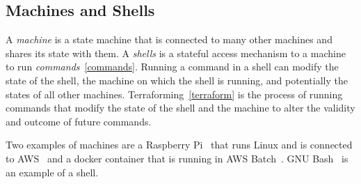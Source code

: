 \subsection{Machines and Shells}
\label{machine}

A \emph{machine} is a state machine that is connected to many other machines and shares its state with them. A \emph{shells} is a stateful access mechanism to a machine to run \emph{commands}~\ref{commands}. Running a command in a shell can modify the state of the shell, the machine on which the shell is running, and potentially the states of all other machines. Terraforming~\ref{terraform} is the process of running commands that modify the state of the shell and the machine to alter the validity and outcome of future commands.

Two examples of machines are a Raspberry Pi~\cite{RaspberryPi} that runs Linux and is connected to AWS~\cite{AWS} and a docker container that is running in AWS Batch~\cite{AWSBatch}. GNU Bash~\cite{bash} is an example of a shell.